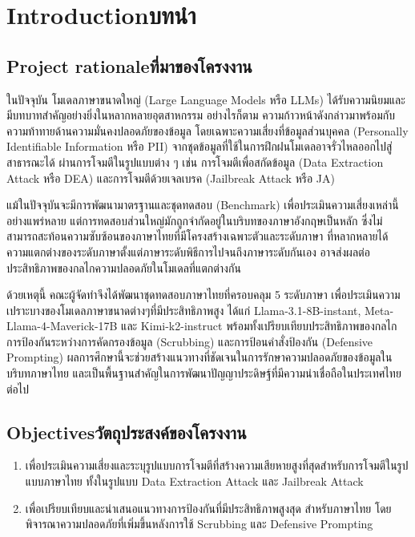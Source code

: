 \chapter{\ifenglish Introduction\else บทนำ\fi}

\section{\ifenglish Project rationale\else ที่มาของโครงงาน\fi}

ในปัจจุบัน โมเดลภาษาขนาดใหญ่ (Large Language Models หรือ LLMs) ได้รับความนิยมและมีบทบาทสำคัญอย่างยิ่งในหลากหลายอุตสาหกรรม อย่างไรก็ตาม 
ความก้าวหน้าดังกล่าวมาพร้อมกับความท้าทายด้านความมั่นคงปลอดภัยของข้อมูล โดยเฉพาะความเสี่ยงที่ข้อมูลส่วนบุคคล (Personally Identifiable Information หรือ PII) 
จากชุดข้อมูลที่ใช้ในการฝึกฝนโมเดลอาจรั่วไหลออกไปสู่สาธารณะได้ ผ่านการโจมตีในรูปแบบต่าง ๆ เช่น การโจมตีเพื่อสกัดข้อมูล (Data Extraction Attack หรือ DEA) 
และการโจมตีด้วยเจลเบรค (Jailbreak Attack หรือ JA) \cite{carlini2021extracting, wei2023jailbroken}


แม้ในปัจจุบันจะมีการพัฒนามาตรฐานและชุดทดสอบ (Benchmark) เพื่อประเมินความเสี่ยงเหล่านี้ \cite{gu2024llmpbe}
\\อย่างแพร่หลาย แต่การทดสอบส่วนใหญ่มักถูกจำกัดอยู่ในบริบทของภาษาอังกฤษเป็นหลัก ซึ่งไม่สามารถสะท้อนความซับซ้อนของภาษาไทยที่มีโครงสร้างเฉพาะตัวและระดับภาษา 
ที่หลากหลายได้ ความแตกต่างของระดับภาษาตั้งแต่ภาษาระดับพิธีการไปจนถึงภาษาระดับกันเอง อาจส่งผลต่อประสิทธิภาพของกลไกความปลอดภัยในโมเดลที่แตกต่างกัน 

ด้วยเหตุนี้ คณะผู้จัดทำจึงได้พัฒนาชุดทดสอบภาษาไทยที่ครอบคลุม 5 ระดับภาษา เพื่อประเมินความเปราะบางของโมเดลภาษาขนาดต่างๆที่มีประสิทธิภาพสูง ได้แก่ 
Llama-3.1-8B-instant, Meta-Llama-4-Maverick-17B และ Kimi-k2-instruct พร้อมทั้งเปรียบเทียบประสิทธิภาพของกลไกการป้องกันระหว่างการคัดกรองข้อมูล 
(Scrubbing) และการป้อนคำสั่งป้องกัน (Defensive Prompting) ผลการศึกษานี้จะช่วยสร้างแนวทางที่ชัดเจนในการรักษาความปลอดภัยของข้อมูลในบริบทภาษาไทย 
และเป็นพื้นฐานสำคัญในการพัฒนาปัญญาประดิษฐ์ที่มีความน่าเชื่อถือในประเทศไทยต่อไป
\section{\ifenglish Objectives\else วัตถุประสงค์ของโครงงาน\fi}
\begin{enumerate}
    \item เพื่อประเมินความเสี่ยงและระบุรูปแบบการโจมตีที่สร้างความเสียหายสูงที่สุดสำหรับการโจมตีในรูป
    \\แบบภาษาไทย ทั้งในรูปแบบ Data Extraction Attack และ Jailbreak Attack
    \item เพื่อเปรียบเทียบและนำเสนอแนวทางการป้องกันที่มีประสิทธิภาพสูงสุด สำหรับภาษาไทย โดย
    \\พิจารณาความปลอดภัยที่เพิ่มขึ้นหลังการใช้ Scrubbing และ Defensive Prompting
\end{enumerate}

